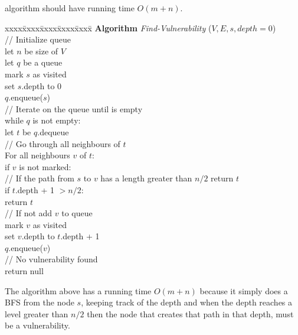 \documentclass[11pt]{article}
\def\ans#1{{\color{ans}#1}}
\begin{document}
\begin{enumerate}
algorithm should have running time $O(m + n)$. 
\begin{tabbing}
  xxxx\=xxxx\=xxxx\=xxxx\=xxxx\= \kill \color{ans}
  {\bf Algorithm} {\em Find-Vulnerability} ($V,E,s, depth=0$)\\ [0pt \color{ans}]
  \> // Initialize queue  \\
  \> let $n$ be size of $V$ \\
  \> let $q$ be a queue \\
  \> mark $s$ as visited \\
  \> set $s$.depth to $0$ \\
  \> $q$.enqueue($s$) \\
  \> // Iterate on the queue until is empty  \\
  \> while $q$ is not empty: \\
  \>\> let $t$ be $q$.dequeue \\
  \>\> // Go through all neighbours of $t$  \\
  \>\> For all neighbours $v$ of $t$: \\
  \>\>\> if $v$ is not marked: \\
  \>\>\>\> // If the path from $s$ to $v$ has a length greater than $n/2$ return $t$ \\
  \>\>\>\> if $t$.depth + 1 $ > n/2$: \\
  \>\>\>\>\> return $t$ \\
  \>\>\>\> // If not add $v$ to queue  \\
  \>\>\>\> mark $v$ as visited \\
  \>\>\>\> set $v$.depth to $t$.depth + 1 \\
  \>\>\>\> $q$.enqueue($v$) \\
  \> // No vulnerability found \\
  \> return null \\
\end{tabbing}
\ans{
  The algorithm above has a running time $O(m+n)$ because it simply does a BFS from the node 
  $s$, keeping track of the depth and when the depth reaches a level greater than $n/2$ 
  then the node that creates that path in that depth, must be a vulnerability. 
}
\end{enumerate}
\end{document}
